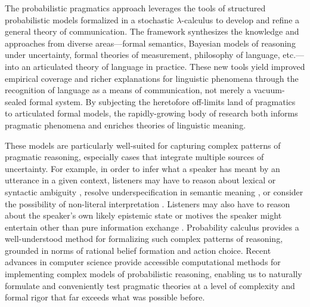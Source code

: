 \documentclass[10pt,letterpaper]{article}
\newcommand{\gcs}[1]{\textcolor{blue}{[gcs: #1]}}
\begin{document}
The probabilistic pragmatics approach leverages the tools of structured probabilistic models formalized in a stochastic $\lambda$-calculus to develop and refine a general theory of communication. The framework synthesizes the knowledge and approaches from diverse areas---formal semantics, Bayesian models of reasoning under uncertainty, formal theories of measurement, philosophy of language, etc.---into an articulated theory of language in practice. These new tools yield improved empirical coverage and richer explanations for linguistic phenomena through the recognition of language as a means of communication, not merely a vacuum-sealed formal system. By subjecting the heretofore off-limits land of pragmatics to articulated formal models, the rapidly-growing body of research both informs pragmatic phenomena and enriches theories of linguistic meaning.


These models are particularly well-suited for capturing complex patterns of pragmatic reasoning, especially cases that integrate multiple sources of uncertainty. For example, in order to infer what a speaker has meant by an utterance in a given context, listeners may have to reason about lexical or syntactic ambiguity \cite{bergenetal2016,savinellietal2017,FrankeBergen2020:Theory-driven-s}, resolve underspecification in semantic meaning \cite{lassitergoodman2013}, or consider the possibility of non-literal interpretation \cite{kaoetal2014metaphor,kaoetal2014}. Listeners may also have to reason about the speaker's own likely epistemic state \cite{goodmanstuhlmuller2013,scontrasgoodman2017,HerbstrittFranke2019:Complex-probabi} or motives the speaker might entertain other than pure information exchange \cite{yoonetal2016,yoonetal2017}. Probability calculus provides a well-understood method for formalizing such complex patterns of reasoning, grounded in norms of rational belief formation and action choice. Recent advances in computer science provide accessible computational methods for implementing complex models of probabilistic reasoning, enabling us to naturally formulate and conveniently test pragmatic theories at a level of complexity and formal rigor that far exceeds what was possible before.
\end{document}

